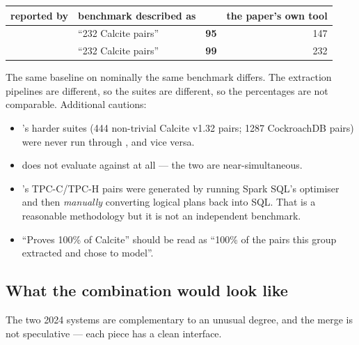 \begin{table}[h]\centering\small
\begin{tabular}{@{}llrr@{}}
\toprule
reported by & benchmark described as & \spes{} & the paper's own tool\\
\midrule
\QED{}~\cite{qed}       & ``232 Calcite pairs'' & \textbf{95} & 147\\
\sqlsolver{}~\cite{sqlsolver} & ``232 Calcite pairs'' & \textbf{99} & 232\\
\bottomrule
\end{tabular}
\end{table}

\noindent The same baseline on nominally the same benchmark differs. The extraction
pipelines are different, so the suites are different, so the percentages are not
comparable. Additional cautions:

\begin{itemize}
\item \QED{}'s harder suites (444 non-trivial Calcite v1.32 pairs; 1287 CockroachDB pairs)
      were never run through \sqlsolver{}, and vice versa.
\item \QED{} does not evaluate against \sqlsolver{} at all --- the two are near-simultaneous.
\item \sqlsolver{}'s TPC-C/TPC-H pairs were generated by running Spark SQL's optimiser and
      then \emph{manually} converting logical plans back into SQL. That is a reasonable
      methodology but it is not an independent benchmark.
\item ``Proves 100\% of Calcite'' should be read as ``100\% of the pairs this group
      extracted and chose to model''.
\end{itemize}


\subsection{What the combination would look like}

The two 2024 systems are complementary to an unusual degree, and the merge is not
speculative --- each piece has a clean interface.

